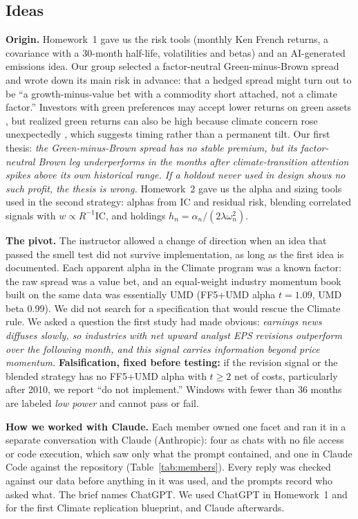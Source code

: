 \documentclass[11pt]{article}
\begin{document}
\subsection{Ideas}
\label{sec:ideas}

\textbf{Origin.} Homework~1 gave us the risk tools (monthly Ken French returns, a covariance with a 30-month half-life, volatilities and betas) and an AI-generated emissions idea. Our group selected a factor-neutral Green-minus-Brown spread and wrote down its main risk in advance: that a hedged spread might turn out to be ``a growth-minus-value bet with a commodity short attached, not a climate factor.'' Investors with green preferences may accept lower returns on green assets \citep{bk}, but realized green returns can also be high because climate concern rose unexpectedly \citep{pst2021,pst2022}, which suggests timing rather than a permanent tilt. Our first thesis: \emph{the Green-minus-Brown spread has no stable premium, but its factor-neutral Brown leg underperforms in the months after climate-transition attention spikes above its own historical range. If a holdout never used in design shows no such profit, the thesis is wrong.} Homework~2 gave us the alpha and sizing tools used in the second strategy: alphas from IC and residual risk, blending correlated signals with $w\propto R^{-1}\mathrm{IC}$, and holdings $h_n=\alpha_n/(2\lambda\omega_n^2)$.

\textbf{The pivot.} The instructor allowed a change of direction when an idea that passed the smell test did not survive implementation, as long as the first idea is documented. Each apparent alpha in the Climate program was a known factor: the raw spread was a value bet, and an equal-weight industry momentum book built on the same data was essentially UMD (FF5+UMD alpha $t=1.09$, UMD beta 0.99). We did not search for a specification that would rescue the Climate rule. We asked a question the first study had made obvious: \emph{earnings news diffuses slowly, so industries with net upward analyst EPS revisions outperform over the following month, and this signal carries information beyond price momentum.} \textbf{Falsification, fixed before testing:} if the revision signal or the blended strategy has no FF5+UMD alpha with $t\geq 2$ net of costs, particularly after 2010, we report ``do not implement.'' Windows with fewer than 36 months are labeled \emph{low power} and cannot pass or fail.

\textbf{How we worked with Claude.} Each member owned one facet and ran it in a separate conversation with Claude (Anthropic): four as chats with no file access or code execution, which saw only what the prompt contained, and one in Claude Code against the repository (Table~\ref{tab:members}). Every reply was checked against our data before anything in it was used, and the prompts record who asked what. The brief names ChatGPT. We used ChatGPT in Homework~1 and for the first Climate replication blueprint, and Claude afterwards.
\end{document}
